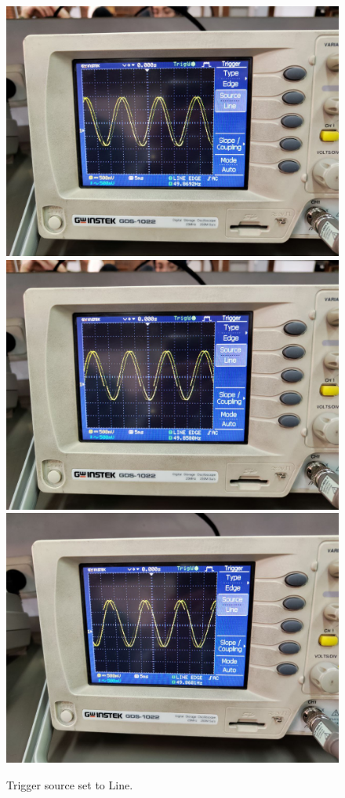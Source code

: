 \documentclass[11pt]{article}
\begin{document}
\begin{question}
{        \begin{figure}[H]
            \begin{center}
                \includegraphics[scale=0.1]{Fig/42.jpeg}
                \includegraphics[scale=0.1]{Fig/43.jpeg}
                \includegraphics[scale=0.1]{Fig/44.jpeg}
                \caption{Trigger source set to Line.}
            \end{center}
        \end{figure}

}
\end{question}
\end{document}

